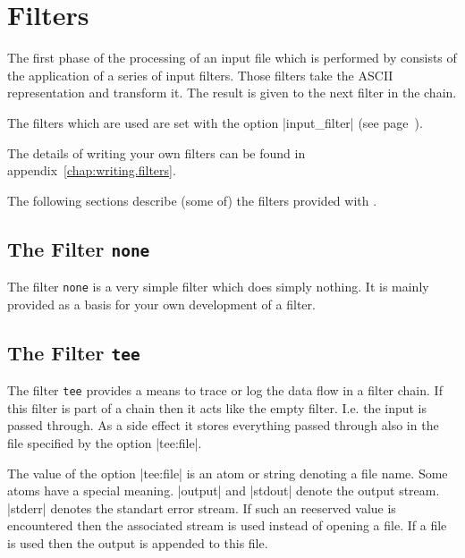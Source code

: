 
\section{\ProTop{} Filters}

The first phase of the processing of an input file which is performed by
\ProTop{} consists of the application of a series of input filters. Those
filters take the ASCII representation and transform it. The result is given to
the next filter in the chain.

The filters which are used are set with the option |input_filter| (see
page~\pageref{opt:input_filter}). 






The details of writing your own filters can be found in
appendix~\ref{chap:writing.filters}. 

The following sections describe (some of) the filters provided with \ProTop.


\subsection{The Filter {\tt none}}

The filter {\tt none} is a very simple filter which does simply nothing. It is
mainly provided as a basis for your own development of a filter.


\subsection{The Filter {\tt tee}}

The filter {\tt tee} provides a means to trace or log the data flow in a
filter chain.  If this filter is part of a chain then it acts like the empty
filter.  I.e. the input is passed through. As a side effect it stores
everything passed through also in the file specified by the option
|tee:file|.

The value of the option |tee:file| is an atom or string denoting a file name.
Some atoms have a special meaning. |output| and |stdout| denote the output
stream.  |stderr| denotes the standart error stream. If such an reeserved
value is encountered then the associated stream is used instead of opening a
file.  If a file is used then the output is appended to this file.

